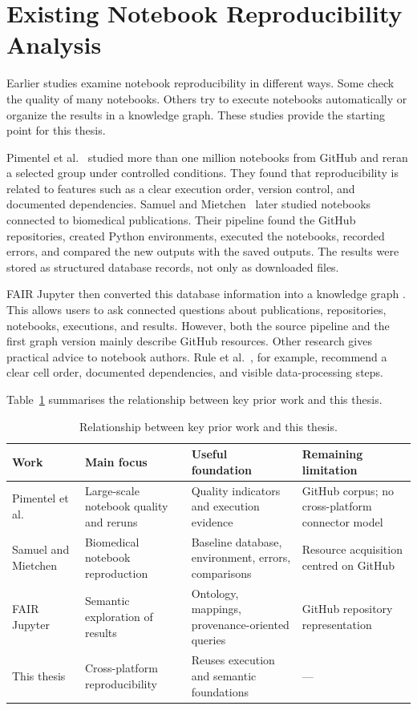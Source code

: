 \clearpage
\section{Existing Notebook Reproducibility Analysis}

Earlier studies examine notebook reproducibility in different ways. Some check the quality of many notebooks. Others try to execute notebooks automatically or organize the results in a knowledge graph. These studies provide the starting point for this thesis.

Pimentel et al.~\cite{pimentel2019} studied more than one million notebooks from GitHub and reran a selected group under controlled conditions. They found that reproducibility is related to features such as a clear execution order, version control, and documented dependencies. Samuel and Mietchen~\cite{samuel2024computational} later studied notebooks connected to biomedical publications. Their pipeline found the GitHub repositories, created Python environments, executed the notebooks, recorded errors, and compared the new outputs with the saved outputs. The results were stored as structured database records, not only as downloaded files.

FAIR Jupyter then converted this database information into a knowledge graph \cite{samuel2024fairjupyter}. This allows users to ask connected questions about publications, repositories, notebooks, executions, and results. However, both the source pipeline and the first graph version mainly describe GitHub resources. Other research gives practical advice to notebook authors. Rule et al.~\cite{rule2019tenrules}, for example, recommend a clear cell order, documented dependencies, and visible data-processing steps.

Table~\ref{tab:related-work} summarises the relationship between key prior work and this thesis.

\begin{table}[ht]
\centering
\caption{Relationship between key prior work and this thesis.}
\label{tab:related-work}
\small
\begin{tabularx}{\textwidth}{@{}p{2.6cm}XXX@{}}
\toprule
Work & Main focus & Useful foundation & Remaining limitation\tabularnewline
\midrule
Pimentel et al.~\cite{pimentel2019} & Large-scale notebook quality and reruns & Quality indicators and execution evidence & GitHub corpus; no cross-platform connector model\tabularnewline
Samuel and Mietchen~\cite{samuel2024computational} & Biomedical notebook reproduction & Baseline database, environment, errors, comparisons & Resource acquisition centred on GitHub\tabularnewline
FAIR Jupyter~\cite{samuel2024fairjupyter} & Semantic exploration of results & Ontology, mappings, provenance-oriented queries & GitHub repository representation\tabularnewline
This thesis & Cross-platform reproducibility & Reuses execution and semantic foundations & ---\tabularnewline
\bottomrule
\end{tabularx}
\end{table}

